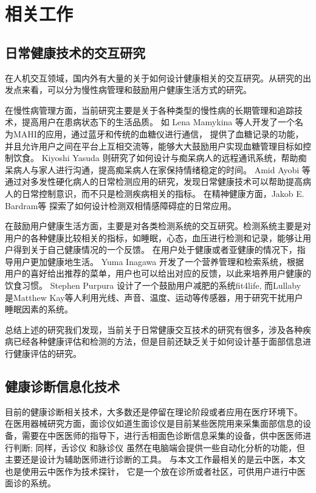\chapter{相关工作}

\section{日常健康技术的交互研究}

在人机交互领域，国内外有大量的关于如何设计健康相关的交互研究。从研究的出发点来看，可以分为慢性病管理和鼓励用户健康生活方式的研究。

在慢性病管理方面，当前研究主要是关于各种类型的慢性病的长期管理和追踪技术，提高用户在患病状态下的生活品质。
如 Lena Mamykina \cite{mamykina2008mahi:}等人开发了一个名为MAHI的应用，通过蓝牙和传统的血糖仪进行通信，
提供了血糖记录的功能，并且允许用户之间在平台上互相交流等，能够大大鼓励用户实现血糖管理目标如控制饮食。
Kiyoshi Yasuda \cite{yasuda2009remote}则研究了如何设计与痴呆病人的远程通讯系统，帮助痴呆病人与家人进行沟通，提高痴呆病人在家保持情绪稳定的时间。
Amid Ayobi 等\cite{ayobi2017quantifying} 通过对多发性硬化病人的日常检测应用的研究，发现日常健康技术可以帮助提高病人的日常控制意识，而不只是检测疾病相关的指标。
在精神健康方面，Jakob E. Bardram等 \cite{bardram2013designing}探索了如何设计检测双相情感障碍症的日常应用。

在鼓励用户健康生活方面，主要是对各类检测系统的交互研究。检测系统主要是对用户的各种健康比较相关的指标，如睡眠，心态，血压进行检测和记录，能够让用户得到关于自己健康情况的一个反馈。
在用户处于健康或者亚健康的情况下，指导用户更加健康地生活。 
Yuma Inagawa  \cite{Inagawa2013A} 开发了一个营养管理和检索系统，根据用户的喜好给出推荐的菜单，用户也可以给出对应的反馈，以此来培养用户健康的饮食习惯。
Stephen Purpura \cite{purpura2011fit4life} 设计了一个鼓励用户减肥的系统fit4life,  而Lullaby  \cite{kay2012lullaby} 是Matthew Kay等人利用光线、声音、温度、运动等传感器，用于研究干扰用户睡眠因素的系统。

总结上述的研究我们发现，当前关于日常健康交互技术的研究有很多，涉及各种疾病已经各种健康评估和检测的方法，但是目前还缺乏关于如何设计基于面部信息进行健康评估的研究。

\section{健康诊断信息化技术}

目前的健康诊断相关技术，大多数还是停留在理论阶段或者应用在医疗环境下。
在医用器械研究方面，面诊仪如道生面诊仪\cite{邸丹2016手持式舌象仪的研制}是目前某些医院用来采集面部信息的设备，需要在中医医师的指导下，进行舌相面色诊断信息采集的设备，供中医医师进行判断;
 同样，舌诊仪\cite{李丹溪2017舌诊仪的发展及其在舌诊客观化研究中的应用现状} 和脉诊仪 \cite{牛婷婷2017脉诊仪}虽然在电脑端会提供一些自动化分析的功能，但主要还是设计为辅助医师进行诊断的工具。
与本文工作最相关的是云中医\cite{Zhang2018Study}，本文也是使用云中医作为技术探针\cite{Hutchinson2003Technology}， 它是一个放在诊所或者社区，可供用户进行中医面诊的系统。

